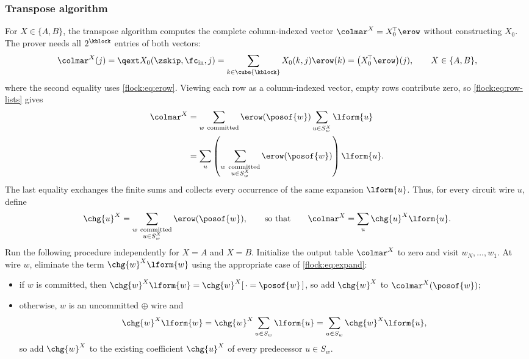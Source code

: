 \subsubsection{Transpose algorithm}\label{flock:backward}

For $X\in\{A,B\}$, the transpose algorithm computes the complete column-indexed vector $\colmar^{X}=X_0^{\!\top}\erow$ without constructing $X_0$. The prover needs all $2^{\kblock}$ entries of both vectors:
\begin{equation}\label{flock:eq:marginal}
\colmar^{X}(j)=\qext X_0(\zskip,\fc_{\mathrm{in}},j)=\sum_{k\in\cube{\kblock}}X_0(k,j)\erow(k)=\bigl(X_0^{\!\top}\erow\bigr)(j),\qquad X\in\{A,B\},
\end{equation}
where the second equality uses \eqref{flock:eq:erow}. Viewing each row as a column-indexed vector, empty rows contribute zero, so \eqref{flock:eq:row-lists} gives
\begin{align*}
\colmar^{X}
&=\sum_{w\ \mathrm{committed}}\erow(\posof{w})\sum_{u\in S^X_w}\lform{u}\\
&=\sum_u\left(\sum_{\substack{w\ \mathrm{committed}\\u\in S^X_w}}\erow(\posof{w})\right)\lform{u}.
\end{align*}
The last equality exchanges the finite sums and collects every occurrence of the same expansion $\lform{u}$. Thus, for every circuit wire $u$, define
\begin{equation*}
\chg{u}^{X}=\sum_{\substack{w\ \mathrm{committed}\\u\in S^X_w}}\erow(\posof{w}),
\qquad \text{so that}\qquad
\colmar^{X}=\sum_u\chg{u}^{X}\lform{u}.
\end{equation*}
Run the following procedure independently for $X=A$ and $X=B$. Initialize the output table $\colmar^{X}$ to zero and visit $w_N,\ldots,w_1$. At wire $w$, eliminate the term $\chg{w}^{X}\lform{w}$ using the appropriate case of \eqref{flock:eq:expand}:
\begin{itemize}
\item if $w$ is committed, then $\chg{w}^{X}\lform{w}=\chg{w}^{X}[\,\cdot=\posof{w}\,]$, so add $\chg{w}^{X}$ to $\colmar^{X}(\posof{w})$;
\item otherwise, $w$ is an uncommitted $\oplus$ wire and
\[
\chg{w}^{X}\lform{w}=\chg{w}^{X}\sum_{u\in S_w}\lform{u}=\sum_{u\in S_w}\chg{w}^{X}\lform{u},
\]
so add $\chg{w}^{X}$ to the existing coefficient $\chg{u}^{X}$ of every predecessor $u\in S_w$.
\end{itemize}

